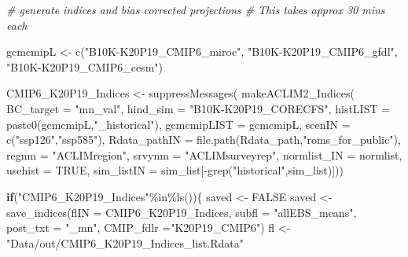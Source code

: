 \documentclass[
]{article}
\newenvironment{Shaded}{\begin{snugshade}}{\end{snugshade}}
\newcommand{\AttributeTok}[1]{\textcolor[rgb]{0.77,0.63,0.00}{#1}}
\newcommand{\CommentTok}[1]{\textcolor[rgb]{0.56,0.35,0.01}{\textit{#1}}}
\newcommand{\ConstantTok}[1]{\textcolor[rgb]{0.00,0.00,0.00}{#1}}
\newcommand{\ControlFlowTok}[1]{\textcolor[rgb]{0.13,0.29,0.53}{\textbf{#1}}}
\newcommand{\FunctionTok}[1]{\textcolor[rgb]{0.00,0.00,0.00}{#1}}
\newcommand{\NormalTok}[1]{#1}
\newcommand{\OtherTok}[1]{\textcolor[rgb]{0.56,0.35,0.01}{#1}}
\newcommand{\SpecialCharTok}[1]{\textcolor[rgb]{0.00,0.00,0.00}{#1}}
\newcommand{\StringTok}[1]{\textcolor[rgb]{0.31,0.60,0.02}{#1}}
\begin{document}
\begin{Shaded}
\begin{Highlighting}[]
    
    \CommentTok{\# generate indices and bias corrected projections }
    \CommentTok{\# This takes approx 30 mins each}
    
\NormalTok{    gcmcmipL }\OtherTok{\textless{}{-}} \FunctionTok{c}\NormalTok{(}\StringTok{"B10K{-}K20P19\_CMIP6\_miroc"}\NormalTok{,}
                  \StringTok{"B10K{-}K20P19\_CMIP6\_gfdl"}\NormalTok{,}
                  \StringTok{"B10K{-}K20P19\_CMIP6\_cesm"}\NormalTok{) }
    
\NormalTok{     CMIP6\_K20P19\_Indices }\OtherTok{\textless{}{-}} \FunctionTok{suppressMessages}\NormalTok{(}
                        \FunctionTok{makeACLIM2\_Indices}\NormalTok{(}
                        \AttributeTok{BC\_target =} \StringTok{"mn\_val"}\NormalTok{,}
                        \AttributeTok{hind\_sim  =}  \StringTok{"B10K{-}K20P19\_CORECFS"}\NormalTok{,}
                        \AttributeTok{histLIST  =} \FunctionTok{paste0}\NormalTok{(gcmcmipL,}\StringTok{"\_historical"}\NormalTok{),}
                        \AttributeTok{gcmcmipLIST =}\NormalTok{ gcmcmipL,  }
                        \AttributeTok{scenIN    =} \FunctionTok{c}\NormalTok{(}\StringTok{"ssp126"}\NormalTok{,}\StringTok{"ssp585"}\NormalTok{),}
                        \AttributeTok{Rdata\_pathIN =} \FunctionTok{file.path}\NormalTok{(Rdata\_path,}\StringTok{"roms\_for\_public"}\NormalTok{),}
                        \AttributeTok{regnm    =} \StringTok{"ACLIMregion"}\NormalTok{,}
                        \AttributeTok{srvynm    =} \StringTok{"ACLIMsurveyrep"}\NormalTok{,}
                        \AttributeTok{normlist\_IN =}\NormalTok{ normlist,}
                        \AttributeTok{usehist    =} \ConstantTok{TRUE}\NormalTok{,}
                        \AttributeTok{sim\_listIN =}\NormalTok{ sim\_list[}\SpecialCharTok{{-}}\FunctionTok{grep}\NormalTok{(}\StringTok{"historical"}\NormalTok{,sim\_list)]))}
    
     \ControlFlowTok{if}\NormalTok{(}\StringTok{"CMIP6\_K20P19\_Indices"}\SpecialCharTok{\%in\%}\FunctionTok{ls}\NormalTok{())\{                 }
\NormalTok{      saved }\OtherTok{\textless{}{-}} \ConstantTok{FALSE}
\NormalTok{      saved }\OtherTok{\textless{}{-}} \FunctionTok{save\_indices}\NormalTok{(}\AttributeTok{flIN =}\NormalTok{ CMIP6\_K20P19\_Indices, }
                   \AttributeTok{subfl =} \StringTok{"allEBS\_means"}\NormalTok{,}
                   \AttributeTok{post\_txt =} \StringTok{"\_mn"}\NormalTok{,}
                   \AttributeTok{CMIP\_fdlr =}\StringTok{"K20P19\_CMIP6"}\NormalTok{)}
\NormalTok{      fl }\OtherTok{\textless{}{-}} \StringTok{"Data/out/CMIP6\_K20P19\_Indices\_list.Rdata"}
      

\end{Highlighting}
\end{Shaded}
\end{document}
